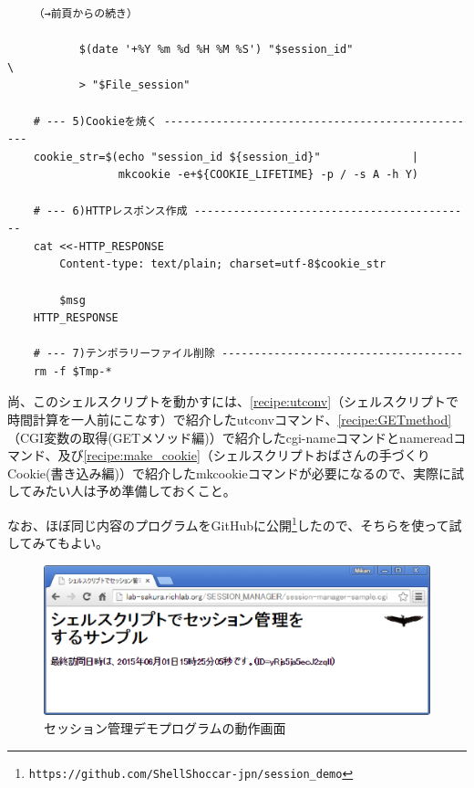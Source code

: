 \begin{frameboxit}{160.0mm}
\begin{verbatim}
	（→前頁からの続き）
	
	       $(date '+%Y %m %d %H %M %S') "$session_id"                            \
	       > "$File_session"
	
	# --- 5)Cookieを焼く -------------------------------------------------
	cookie_str=$(echo "session_id ${session_id}"              |
	             mkcookie -e+${COOKIE_LIFETIME} -p / -s A -h Y)
	
	# --- 6)HTTPレスポンス作成 -------------------------------------------
	cat <<-HTTP_RESPONSE
	    Content-type: text/plain; charset=utf-8$cookie_str
	
	    $msg
	HTTP_RESPONSE
	
	# --- 7)テンポラリーファイル削除 -------------------------------------
	rm -f $Tmp-*
\end{verbatim}
\end{frameboxit}

尚、このシェルスクリプトを動かすには、\ref{recipe:utconv}（シェルスクリプトで時間計算を一人前にこなす）で紹介したutconvコマンド、\ref{recipe:GETmethod}（CGI変数の取得(GETメソッド編)）で紹介したcgi-nameコマンドとnamereadコマンド、及び\ref{recipe:make_cookie}（シェルスクリプトおばさんの手づくりCookie(書き込み編)）で紹介したmkcookieコマンドが必要になるので、実際に試してみたい人は予め準備しておくこと。

なお、ほぼ同じ内容のプログラムをGitHubに公開\footnote{\verb|https://github.com/ShellShoccar-jpn/session_demo|}したので、そちらを使って試してみてもよい。
\begin{figure}[H]
	\begin{center}
		\includegraphics*[scale=0.50]{tex/4_web/figs/session_manager_demo.eps}
		\vspace{-2mm}
		\caption{セッション管理デモプログラムの動作画面}
		\label{fig:session_manager_demo}
		\vspace{-5mm}
	\end{center}
\end{figure}

